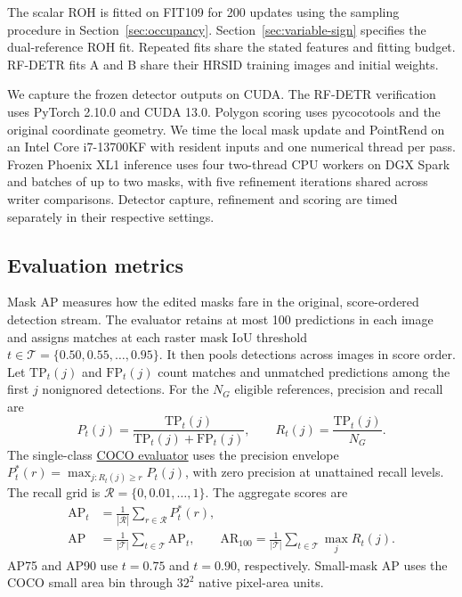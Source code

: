\documentclass[journal]{IEEEtran}
\begin{document}
The scalar ROH is fitted on FIT109 for 200 updates using the sampling procedure in Section~\ref{sec:occupancy}. Section~\ref{sec:variable-sign} specifies the dual-reference ROH fit. Repeated fits share the stated features and fitting budget. RF-DETR fits A and B share their HRSID training images and initial weights.

We capture the frozen detector outputs on CUDA. The RF-DETR verification uses PyTorch 2.10.0 and CUDA 13.0. Polygon scoring uses pycocotools and the original coordinate geometry. We time the local mask update and PointRend on an Intel Core i7-13700KF with resident inputs and one numerical thread per pass. Frozen Phoenix XL1 inference uses four two-thread CPU workers on DGX Spark and batches of up to two masks, with five refinement iterations shared across writer comparisons. Detector capture, refinement and scoring are timed separately in their respective settings.

\subsection{Evaluation metrics}
\label{sec:metrics}

Mask AP measures how the edited masks fare in the original, score-ordered detection stream. The evaluator retains at most 100 predictions in each image and assigns matches at each raster mask IoU threshold \(t\in\mathcal T=\{0.50,0.55,\ldots,0.95\}\). It then pools detections across images in score order. Let \(\mathrm{TP}_t(j)\) and \(\mathrm{FP}_t(j)\) count matches and unmatched predictions among the first \(j\) nonignored detections. For the \(N_G\) eligible references, precision and recall are
\begin{equation}
 P_t(j)=\frac{\mathrm{TP}_t(j)}{\mathrm{TP}_t(j)+\mathrm{FP}_t(j)},
 \qquad R_t(j)=\frac{\mathrm{TP}_t(j)}{N_G}.
\end{equation}
The single-class \href{https://github.com/cocodataset/cocoapi/blob/master/PythonAPI/pycocotools/cocoeval.py}{COCO evaluator} uses the precision envelope \(P_t^*(r)=\max_{j:R_t(j)\ge r}P_t(j)\), with zero precision at unattained recall levels. The recall grid is \(\mathcal R=\{0,0.01,\ldots,1\}\). The aggregate scores are
\begin{equation}
\begin{aligned}
 \mathrm{AP}_t&=\frac{1}{|\mathcal R|}\sum_{r\in\mathcal R}P_t^*(r),\\
 \mathrm{AP}&=\frac{1}{|\mathcal T|}\sum_{t\in\mathcal T}\mathrm{AP}_t,\qquad
 \mathrm{AR}_{100}=\frac{1}{|\mathcal T|}\sum_{t\in\mathcal T}\max_j R_t(j).
\end{aligned}
\label{eq:coco-metrics}
\end{equation}
AP75 and AP90 use \(t=0.75\) and \(t=0.90\), respectively. Small-mask AP uses the COCO small area bin through \(32^2\) native pixel-area units.
\end{document}
